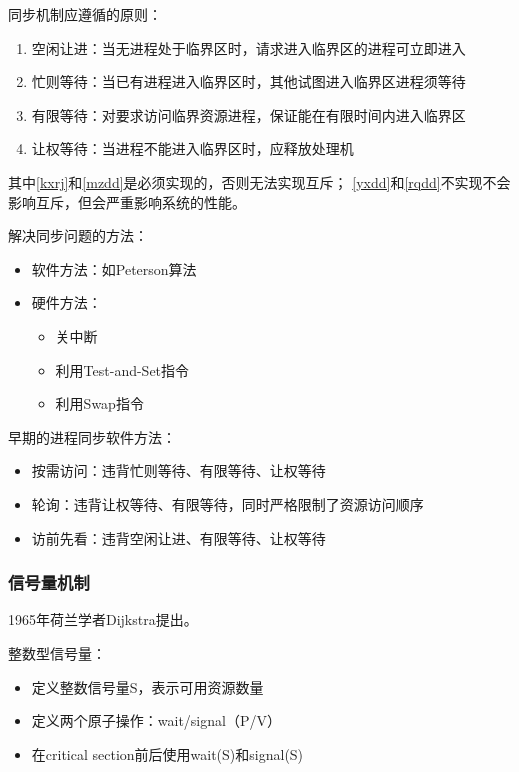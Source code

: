 \documentclass[12pt, a4paper, oneside]{ctexart}
\begin{document}
同步机制应遵循的原则：
\begin{enumerate}
    \item \label{kxrj}空闲让进：当无进程处于临界区时，请求进入临界区的进程可立即进入
    \item \label{mzdd}忙则等待：当已有进程进入临界区时，其他试图进入临界区进程须等待
    \item \label{yxdd}有限等待：对要求访问临界资源进程，保证能在有限时间内进入临界区
    \item \label{rqdd}让权等待：当进程不能进入临界区时，应释放处理机
\end{enumerate}

其中\ref{kxrj}和\ref{mzdd}是必须实现的，否则无法实现互斥；
\ref{yxdd}和\ref{rqdd}不实现不会影响互斥，但会严重影响系统的性能。

解决同步问题的方法：
\begin{itemize}
    \item 软件方法：如Peterson算法
    \item 硬件方法：
    \begin{itemize}
        \item 关中断
        \item 利用Test-and-Set指令
        \item 利用Swap指令
    \end{itemize}
\end{itemize}

早期的进程同步软件方法：
\begin{itemize}
    \item 按需访问：违背忙则等待、有限等待、让权等待
    \item 轮询：违背让权等待、有限等待，同时严格限制了资源访问顺序
    \item 访前先看：违背空闲让进、有限等待、让权等待
\end{itemize}

\subsubsection{信号量机制}

1965年荷兰学者Dijkstra提出。

整数型信号量：
\begin{itemize}
    \item 定义整数信号量S，表示可用资源数量
    \item 定义两个原子操作：wait/signal（P/V）
    \item 在critical section前后使用wait(S)和signal(S)
\end{itemize}
\end{document}
